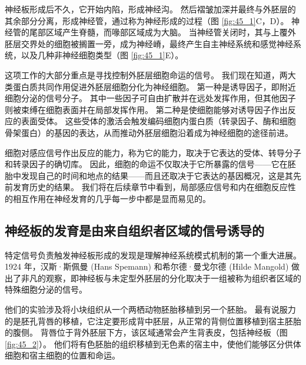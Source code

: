 神经板形成后不久，它开始内陷，形成神经沟。
然后褶皱加深并最终与外胚层的其余部分分离，形成神经管，通过称为神经形成的过程（图 \ref{fig:45_1}C，D）。
神经管的尾部区域产生脊髓，而喙部区域成为大脑。
当神经管关闭时，其与上覆外胚层交界处的细胞被搁置一旁，成为神经嵴，最终产生自主神经系统和感觉神经系统，以及几种非神经细胞类型（图 \ref{fig:45_1}E）。


这项工作的大部分重点是寻找控制外胚层细胞命运的信号。
我们现在知道，两大类蛋白质共同作用促进外胚层细胞分化为神经细胞。
第一种是诱导因子，即附近细胞分泌的信号分子。
其中一些因子可自由扩散并在远处发挥作用，但其他因子则被束缚在细胞表面并在局部发挥作用。
第二种是使细胞能够对诱导因子作出反应的表面受体。
这些受体的激活会触发编码细胞内蛋白质（转录因子、酶和细胞骨架蛋白）的基因的表达，从而推动外胚层细胞沿着成为神经细胞的途径前进。


细胞对感应信号作出反应的能力，称为它的能力，取决于它表达的受体、转导分子和转录因子的确切库。
因此，细胞的命运不仅取决于它所暴露的信号——它在胚胎中发现自己的时间和地点的结果——而且还取决于它表达的基因概况，这是其先前发育历史的结果。
我们将在后续章节中看到，局部感应信号和内在细胞反应性的相互作用在神经发育的几乎每一步中都是显而易见的。



\subsection{神经板的发育是由来自组织者区域的信号诱导的}

特定信号负责触发神经板形成的发现是理解神经系统模式机制的第一个重大进展。
1924 年，汉斯·斯佩曼 (Hans Spemann) 和希尔德·曼戈尔德 (Hilde Mangold) 做出了非凡的观察，即神经板与未定型外胚层的分化取决于一组被称为组织者区域的特殊细胞分泌的信号。


他们的实验涉及将小块组织从一个两栖动物胚胎移植到另一个胚胎。
最有说服力的是胚孔背唇的移植，它注定要形成背中胚层，从正常的背侧位置移植到宿主胚胎的腹侧。
背唇位于背外胚层下方，该区域通常会产生背表皮，包括神经板（图 \ref{fig:45_2}）。
他们将有色胚胎的组织移植到无色素的宿主中，使他们能够区分供体细胞和宿主细胞的位置和命运。



